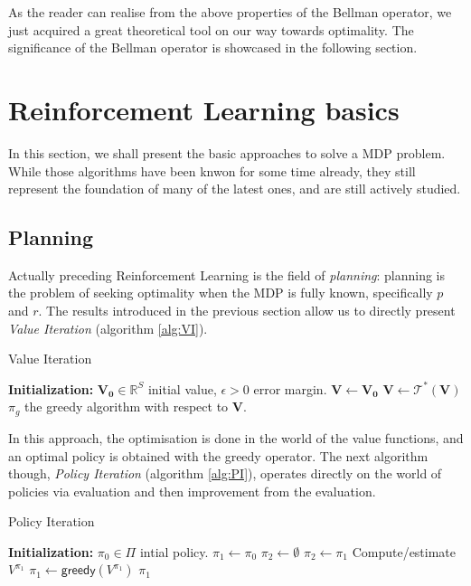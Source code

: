As the reader can realise from the above properties of the Bellman operator, we just acquired a great theoretical tool on our way towards optimality. The significance of the Bellman operator is showcased in the following section.


\section{Reinforcement Learning basics}
\label{section:RL}

In this section, we shall present the basic approaches to solve a MDP problem. While those algorithms have been knwon for some time already, they still represent the foundation of many of the latest ones, and are still actively studied.

\subsection{Planning}
\label{subsec:RL-planning}

Actually preceding Reinforcement Learning is the field of \emph{planning}: planning is the problem of seeking optimality when the MDP is fully known, specifically $p$ and $r$. The results introduced in the previous section allow us to directly present \emph{Value Iteration} (algorithm \ref{alg:VI}).

\begin{algorithm}[htbp]
\small
\caption{Value Iteration}
\label{alg:VI}
\begin{algorithmic}
\State \textbf{Initialization:} $\mathbf{V_0} \in \mathbb{R}^S$ initial value, $\epsilon > 0$ error margin.
\State $\mathbf{V} \leftarrow \mathbf{V_0}$
\State $\mathbf{V} \leftarrow \mathcal{T}^*(\mathbf{V})$
\EndWhile\State
\Return $\pi_g$ the greedy algorithm with respect to $\mathbf{V}$.
\end{algorithmic}
\normalsize
\end{algorithm}

In this approach, the optimisation is done in the world of the value functions, and an optimal policy is obtained with the greedy operator. The next algorithm though, \emph{Policy Iteration} (algorithm \ref{alg:PI}), operates directly on the world of policies via evaluation and then improvement from the evaluation.

\begin{algorithm}[htbp]
\small
\caption{Policy Iteration}
\label{alg:PI}
\begin{algorithmic}
\State \textbf{Initialization:} $\pi_0 \in \Pi$ intial policy.
\State $\pi_1 \leftarrow \pi_0$
\State $\pi_2 \leftarrow \emptyset$
\State $\pi_2 \leftarrow \pi_1$
\State Compute/estimate $V^{\pi_1}$ 
\State $\pi_1 \leftarrow \mathsf{greedy}(V^{\pi_1})$ 
\EndWhile\State
\Return $\pi_1$
\end{algorithmic}
\normalsize
\end{algorithm}



